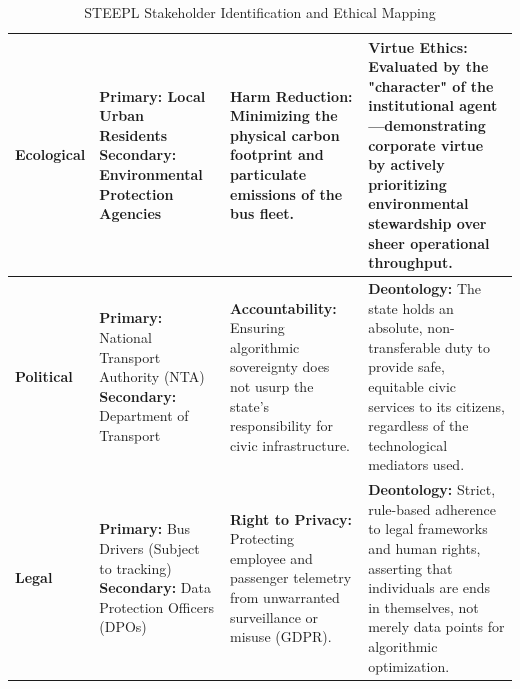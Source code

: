 \documentclass[]
{UCD_CS_41820_Report}
\begin{document}
\begin{table}[H]
\begin{tabular}{|p{1.7cm}|p{3.7cm}|p{3.5cm}|p{4.5cm}|}
    \textbf{Ecological}                                                                                                           &
    \textbf{Primary:} Local Urban Residents \newline
    \textbf{Secondary:} Environmental Protection Agencies                                                                         &
    \textbf{Harm Reduction:} Minimizing the physical carbon footprint and particulate emissions of the bus fleet.                 &
    \textbf{Virtue Ethics:} Evaluated by the "character" of the institutional agent—demonstrating corporate virtue by actively prioritizing environmental stewardship over sheer operational throughput.                \\
    \hline

    \textbf{Political}                                                                                                            &
    \textbf{Primary:} National Transport Authority (NTA) \newline
    \textbf{Secondary:} Department of Transport                                                                                   &
    \textbf{Accountability:} Ensuring algorithmic sovereignty does not usurp the state's responsibility for civic infrastructure. &
    \textbf{Deontology:} The state holds an absolute, non-transferable duty to provide safe, equitable civic services to its citizens, regardless of the technological mediators used.                                  \\
    \hline

    \textbf{Legal}                                                                                                                &
    \textbf{Primary:} Bus Drivers (Subject to tracking) \newline
    \textbf{Secondary:} Data Protection Officers (DPOs)                                                                           &
    \textbf{Right to Privacy:} Protecting employee and passenger telemetry from unwarranted surveillance or misuse (GDPR).        &
    \textbf{Deontology:} Strict, rule-based adherence to legal frameworks and human rights, asserting that individuals are ends in themselves, not merely data points for algorithmic optimization.                     \\
    \hline
  \end{tabular}
  \caption{STEEPL Stakeholder Identification and Ethical Mapping}
\end{table}
\end{document}
